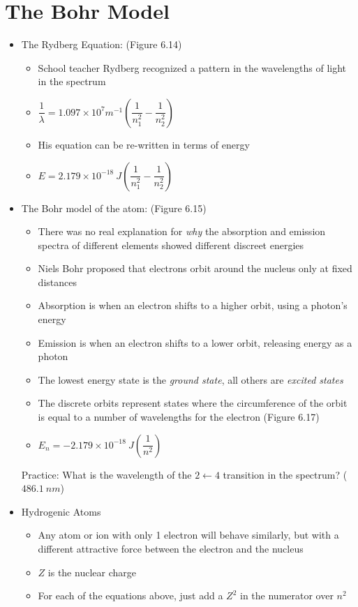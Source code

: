 \documentclass[12pt, openany, letterpaper]{memoir}
\begin{document}
\section{The Bohr Model}
\begin{itemize}
	\item The Rydberg Equation: (Figure 6.14)
	      \begin{itemize}
		      \item School teacher Rydberg recognized a pattern in the wavelengths of light in the  spectrum
          \item $\dfrac{1}{\lambda}=1.097\times10^{7}m^{-1}\left(\dfrac{1}{n_1^2}-\dfrac{1}{n_2^2}\right)$
		      \item His equation can be re-written in terms of energy
		      \item $E=2.179\times10^{-18}~J\left(\dfrac{1}{n_1^2}-\dfrac{1}{n_2^2}\right)$
	      \end{itemize}
	\item The Bohr model of the atom: (Figure 6.15)
	      \begin{itemize}
		      \item There was no real explanation for \emph{why} the absorption and emission spectra of different elements showed different discreet energies
		      \item Niels Bohr proposed that electrons orbit around the nucleus only at fixed distances
		      \item Absorption is when an electron shifts to a higher orbit, using a photon's energy
		      \item Emission is when an electron shifts to a lower orbit, releasing energy as a photon
		      \item The lowest energy state is the \emph{ground state}, all others are \emph{excited states}
		      \item The discrete orbits represent states where the circumference of the orbit is equal to a number of wavelengths for the electron (Figure 6.17)
          \item $E_n=-2.179\times10^{-18}~J\left(\dfrac{1}{n^2}\right)$
	      \end{itemize}
	      Practice: What is the wavelength of the $2\leftarrow4$ transition in the  spectrum? ($486.1~nm$)
  \item Hydrogenic Atoms
    \begin{itemize}
      \item Any atom or ion with only 1 electron will behave similarly, but with a different attractive force between the electron and the nucleus
      \item $Z$ is the nuclear charge
      \item For each of the equations above, just add a $Z^2$ in the numerator over $n^2$
    \end{itemize}
\end{itemize}
\end{document}
